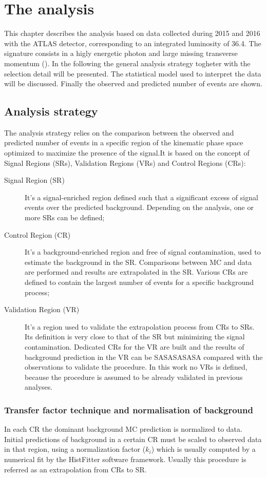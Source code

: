 \chapter{The \mph analysis}
\label{chapt:mph}
\lettrine{T}{}his chapter describes the \mph analysis based on data collected during 2015 and 2016 with the ATLAS detector, corresponding to an integrated luminosity of \SI{36.4}{\ifb}.
The \mph signature consists in a higly energetic photon and large missing transverse momentum (\met). In the following the general analysis strategy togheter with the selection detail will be presented. The statistical model used to interpret the data will be discussed. Finally the observed and predicted number of events are shown.

\section{Analysis strategy}
The \mph analysis strategy relies on the comparison between the observed and predicted number of events in a specific region of the kinematic phase space optimized to maximize the presence of the signal.It is based on the concept of Signal Regions (SRs), Validation Regions (VRs) and Control Regions (CRs):
\begin{description}
\item[Signal Region (SR)] It's a signal-enriched region defined such that a significant excess of signal events over the predicted background. Depending on the analysis, one or more SRs can be defined;
\item[Control Region (CR)] It's a background-enriched region and free of signal contamination, used to estimate the background in the SR. Comparisons between MC and data are performed and results are extrapolated in the SR. Various CRs are defined to contain the largest number of events for a specific background process;
\item[Validation Region (VR)] It's a region used to validate the extrapolation process from CRs to SRs. Its definition is very close to that of the SR but minimizing the signal contamination. Dedicated CRs for the VR are built and the results of background prediction in the VR can be SASASASASA compared with the observations to validate the procedure.
In this work no VRs is defined, because the procedure is assumed to be already validated in previous analyses.
\end{description}

\subsection{Transfer factor technique and normalisation of background}
\label{sec:kfactor}
In each CR the dominant background MC prediction is normalized to data. Initial predictions of background in a certain CR must be scaled to observed data in that region, using a normalization factor ($k_{i}$) which is usually computed by a numerical fit by the HistFitter software framework. Usually this procedure is referred as an extrapolation from CRs to SR.

